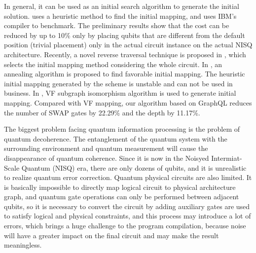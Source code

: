 \documentclass[runningheads]{llncs}
\begin{document}
In general, it can be used as an initial search algorithm to generate the initial solution. 
\cite{Paler2018} uses a heuristic method to find the initial mapping, and uses IBM's compiler to benchmark. 
The preliminary results show that the cost can be reduced by up to 10\% only by placing qubits 
that are different from the default position (trivial placement) only in the actual circuit instance 
on the actual NISQ architecture. Recently, a novel reverse traversal technique is proposed in \cite{Li2018}, 
which selects the initial mapping method considering the whole circuit. 
In \cite{Xiangzhen2020}, an annealing algorithm is proposed to find favorable initial mapping. 
The heuristic initial mapping generated by the scheme is unstable 
and can not be used in business. In \cite{2020Qubit}, VF subgraph isomorphism algorithm is 
used to generate initial mapping. 
Compared with VF mapping, our algorithm 
based on GraphQL reduces 
the number of SWAP gates by 22.29\% and the depth by 11.17\%.


The biggest problem facing quantum information processing is the problem of quantum decoherence.
The entanglement of the quantum system with the surrounding environment and quantum measurement 
will cause the disappearance of quantum coherence.
Since it is now in the Noisyed Intermiat-Scale Quantum (NISQ) era, there are only dozens of qubits, 
and it is unrealistic to realize quantum error correction\cite{2018QuantumPreskill}.
Quantum physical circuits are also limited. It is basically impossible to directly map logical circuit
to physical architecture graph, and quantum gate operations can only be performed between adjacent qubits, 
so it is necessary to convert the circuit by adding auxiliary gates are used to satisfy logical and physical 
constraints, and this process may introduce a lot of errors, 
which brings a huge challenge to the program compilation, because noise will have a greater impact on the 
final circuit and may make the result meaningless.
\end{document}
